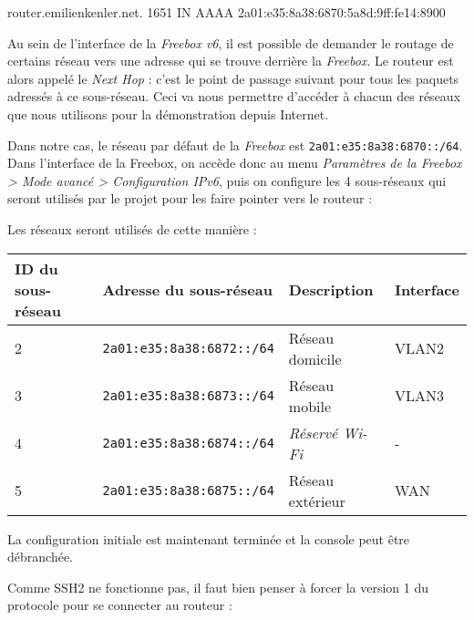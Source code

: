 \begin{code}
router.emilienkenler.net. 1651  IN      AAAA    2a01:e35:8a38:6870:5a8d:9ff:fe14:8900
\end{code}

Au sein de l'interface de la \emph{Freebox v6}, il est possible de demander le routage de certains réseau vers une adresse qui se trouve derrière la \emph{Freebox}.
Le routeur est alors appelé le \emph{Next Hop} : c'est le point de passage suivant pour tous les paquets adressés à ce sous-réseau.
Ceci va nous permettre d'accéder à chacun des réseaux que nous utilisons pour la démonstration depuis Internet.

Dans notre cas, le réseau par défaut de la \emph{Freebox} est \texttt{2a01:e35:8a38:6870::/64}.
Dans l'interface de la Freebox, on accède donc au menu \emph{Paramètres de la Freebox > Mode avancé > Configuration IPv6}, puis on configure les 4 sous-réseaux qui seront utilisés par le projet pour les faire pointer vers le routeur :


Les réseaux seront utilisés de cette manière :

\begin{center}
    \begin{tabular}{|l|l|l|l|}
    \hline
    ID du sous-réseau & Adresse du sous-réseau           & Description                          & Interface \\ \hline
    2                 & \texttt{2a01:e35:8a38:6872::/64} & Réseau domicile                      & VLAN2     \\ \hline
    3                 & \texttt{2a01:e35:8a38:6873::/64} & Réseau mobile                        & VLAN3     \\ \hline
    4                 & \texttt{2a01:e35:8a38:6874::/64} & \emph{Réservé Wi-Fi}                       & -         \\ \hline
    5                 & \texttt{2a01:e35:8a38:6875::/64} & Réseau extérieur & WAN       \\ \hline
    \end{tabular}
\end{center}

La configuration initiale est maintenant terminée et la console peut être débranchée.

Comme SSH2 ne fonctionne pas, il faut bien penser à forcer la version 1 du protocole pour se connecter au routeur :


